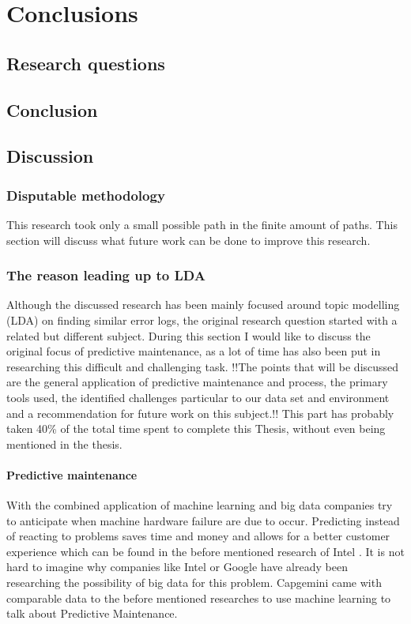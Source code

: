 \chapter{Conclusions} \label{ch:conclusions}

\section{Research questions}



\section{Conclusion}

\section{Discussion}

\subsection {Disputable methodology}
This research took only a small possible path in the finite amount of paths. This section will discuss what future work can be done to improve this research.

\subsection{The reason leading up to LDA}\label{conclusion:discussion}
Although the discussed research has been mainly focused around topic modelling (LDA) on finding similar error logs, the original research question started with a related but different subject. During this section I would like to discuss the original focus of predictive maintenance, as a lot of time has also been put in researching this difficult and challenging task. !!The points that will be discussed are the general application of predictive maintenance and process, the primary tools used, the identified challenges particular to our data set and environment and a recommendation for future work on this subject.!! This part has probably taken 40\% of the total time spent to complete this Thesis, without even being mentioned in the thesis.

\subsubsection{Predictive maintenance}
With the combined application of machine learning and big data companies try to anticipate when machine hardware failure are due to occur. Predicting instead of reacting to problems saves time and money and allows for a better customer experience which can be found in the before mentioned research of Intel \cite{Sipos2014Log-basedMaintenance}\cite{AjayChandramoulyRavindraNarkhedeVijayMungaraGuillermoRueda2013ReducingAnalytics}. It is not hard to imagine why companies like Intel  or Google have already been researching the possibility of big data for this problem. Capgemini came with comparable data to the before mentioned researches to use machine learning to talk about Predictive Maintenance.

